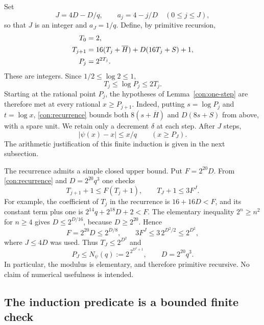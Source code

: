 Set
\begin{equation}
 J=4D-D/q,\qquad a_j=4-j/D\quad(0\leq j\leq J),
 \label{con:levels}
\end{equation}
so that $J$ is an integer and $a_J=1/q$.  Define, by primitive recursion,
\begin{align}
 T_0&=2,\notag\\
 T_{j+1}&=16(T_j+\overline H)+D(16T_j+S)+1,\label{con:recurrence}\\
 P_j&=2^{2T_j}.\notag
\end{align}
These are integers.  Since $1/2\leq\log2\leq1$,
\begin{equation}
 T_j\leq\log P_j\leq2T_j.\label{con:dyadic-threshold}
\end{equation}
Starting at the rational point $P_j$, the hypotheses of
Lemma~\ref{con:one-step} are therefore met at every rational
$x\geq P_{j+1}$.  Indeed, putting $s=\log P_j$ and $t=\log x$,
\eqref{con:recurrence} bounds both $8(s+\overline H)$ and
$D(8s+S)$ from above, with a spare unit.
We retain only a decrement $\delta$ at each step.  After $J$ steps,
\begin{equation}
 |\psi(x)-x|\leq x/q\qquad(x\geq P_J).
 \label{con:psi-at-recursive-threshold}
\end{equation}
The arithmetic justification of this finite induction is given in the
next subsection.

The recurrence admits a simple closed upper bound.  Put $F=2^{20}D$.
From \eqref{con:recurrence} and $D=2^{20}q^3$ one checks
\[
 T_{j+1}+1\leq F(T_j+1),\qquad
 T_J+1\leq3F^J.
\]
For example, the coefficient of $T_j$ in the recurrence is
$16+16D<F$, and its constant term plus one is
$2^{14}q+2^{18}D+2<F$.
The elementary inequality $2^n\geq n^2$ for $n\geq4$ gives
$D\leq2^{D/16}$, because $D\geq2^{20}$.  Hence
\[
 F=2^{20}D\leq2^{D/8},\qquad
 3F^J\leq3\,2^{D^2/2}\leq2^{D^2},
\]
where $J\leq4D$ was used.  Thus $T_J\leq2^{D^2}$ and
\begin{equation}
 P_J\leq N_\psi(q):=2^{\,2^{D^2+1}},
       \qquad D=2^{20}q^3.
 \label{con:closed-modulus}
\end{equation}
In particular, the modulus is elementary, and therefore primitive
recursive.  No claim of numerical usefulness is intended.

\subsection{The induction predicate is a bounded finite check}
\label{con:bounded-induction}

